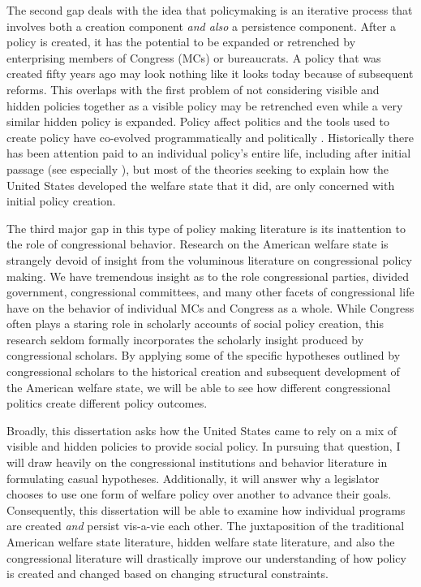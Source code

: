 \documentclass[12pt]{article}
\begin{document}
The second gap deals with the idea that policymaking is an iterative process that involves both a creation component \emph{and also} a persistence component. After a policy is created, it has the potential to be expanded or retrenched by enterprising members of Congress (MCs) or bureaucrats. A policy that was created fifty years ago may look nothing like it looks today because of subsequent reforms. This overlaps with the first problem of not considering visible and hidden policies together as a visible policy may be retrenched even while a very similar hidden policy is expanded. Policy affect politics and the tools used to create policy have co-evolved programmatically and politically \citep{schattschneider1960, skocpol1995}.  Historically there has been attention paid to an individual policy's entire life, including after initial passage (see especially \cite{derthick1979, hacker2002}), but most of the theories seeking to explain how the United States developed the welfare state that it did, are only concerned with initial policy creation. 

The third major gap in this type of policy making literature is its inattention to the role of congressional behavior. Research on the American welfare state is strangely devoid of insight from the voluminous literature on congressional policy making. We have tremendous insight as to the role congressional parties, divided government, congressional committees, and many other facets of congressional life have on the behavior of individual MCs and Congress as a whole. While Congress often plays a staring role in scholarly accounts of social policy creation, this research seldom formally incorporates the scholarly insight produced by congressional scholars. By applying some of the specific hypotheses outlined by congressional scholars to the historical creation and subsequent development of the American welfare state, we will be able to see how different congressional politics create different policy outcomes.

Broadly, this dissertation asks how the United States came to rely on a mix of visible and hidden policies to provide social policy. In pursuing that question, I will draw heavily on the congressional institutions and behavior literature in formulating casual hypotheses. Additionally, it will answer why a legislator chooses to use one form of welfare policy over another to advance their goals. Consequently, this dissertation will be able to examine how individual programs are created \emph{and} persist vis-a-vie each other. The juxtaposition of the traditional American welfare state literature, hidden welfare state literature, and also the congressional literature will drastically improve our understanding of how policy is created and changed  based on changing structural constraints.
\end{document}
